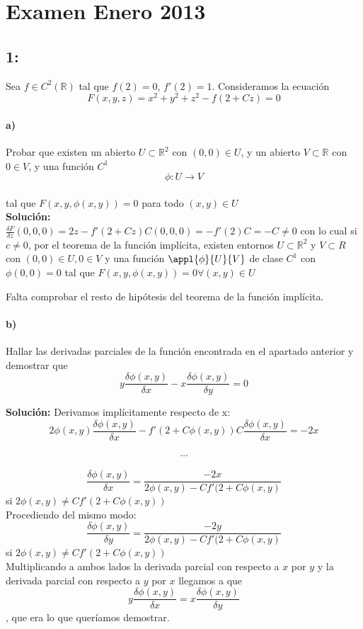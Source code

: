 \section{Examen Enero 2013}
\subsection{1:}

Sea $f\in C^2(\mathbb{R})$ tal que $f(2) = 0$, $f'(2)=1$. Consideramos la ecuación \\$$F(x,y,z) = x^2+y^2+z^2-f(2+Cz)=0$$

\paragraph{a)} Probar que existen un abierto $U\subset \mathbb{R}^2$ con $(0,0)\in U$, y un abierto $V\subset \mathbb{R}$ con $0\in V$, y una función $C^1$\\$$\phi: U \rightarrow V$$\\tal que $F(x, y, \phi (x, y)) = 0$ para todo $(x,y) \in U$\\

\textbf{Solución:}\\
$\frac{\delta F}{\delta z}(0,0,0) = 2z - f'(2+Cz)C (0,0,0) =-f'(2)C = -C \neq 0$
con lo cual si $c\neq 0$, por el teorema de la función implícita, existen entornos $U\subset \mathbb{R}^2$ y $V\subset{R}$ con $(0,0)\in U, 0\in V$ y una función $\appl{\phi}{U}{V}$ de clase $C^1$ con $\phi (0,0) = 0$ tal que $F(x,y,\phi (x,y)) = 0 \forall (x,y)\in U$

Falta comprobar el resto de hipótesis del teorema de la función implícita.

\paragraph{b)} Hallar las derivadas parciales de la función encontrada en el apartado anterior y demostrar que \\

$$y\frac{\delta \phi (x,y)}{\delta x} - x\frac{\delta \phi (x,y)}{\delta y} = 0$$

\textbf{Solución:}
Derivamos implícitamente respecto de x:\\
$$2\phi (x,y) \frac{\delta \phi (x,y)}{\delta x} - f'(2+C\phi (x,y))C\frac{\delta \phi (x,y)}{\delta x}=-2x$$\\
$$\hdots$$\\
$$\frac{\delta \phi (x,y)}{\delta x} = \frac{-2x}{2\phi (x,y) - Cf'(2+C\phi (x,y)}$$ si $2\phi (x,y) \neq Cf'(2+C\phi (x,y))$
\\Procediendo del mismo modo: \\
$$\frac{\delta \phi (x,y)}{\delta y} = \frac{-2y}{2\phi (x,y) - Cf'(2+C\phi (x,y)}$$ si $2\phi (x,y) \neq Cf'(2+C\phi (x,y))$\\
Multiplicando a ambos lados la derivada parcial con respecto a $x$ por $y$ y la derivada parcial con respecto a $y$ por $x$ llegamos a que\\ $$y\frac{\delta \phi (x,y)}{\delta x} = x\frac{\delta \phi (x,y)}{\delta y}$$, que era lo que queríamos demostrar.

